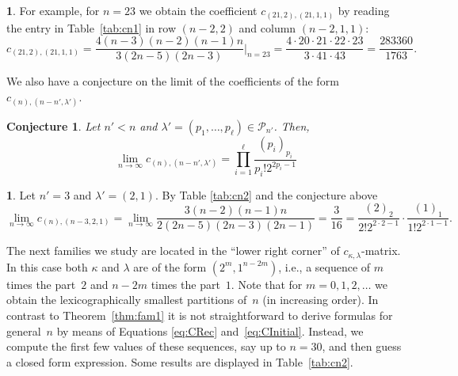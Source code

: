 \documentclass{mathincs}
\numberwithin{equation}{section}
\numberwithin{figure}{section}
\theoremstyle{plain}
\theoremstyle{definition}
\theoremstyle{remark}
\theoremstyle{plain}
\theoremstyle{definition}
\newtheorem{example}[thm]{\protect\examplename}
\theoremstyle{plain}
\theoremstyle{plain}
\newtheorem{conj}[thm]{Conjecture}
\providecommand{\examplename}{Example}
\begin{document}
\begin{example}
For example, for $n=23$ we obtain the coefficient $c_{(21,2),(21,1,1)}$ by
reading the entry in Table~\ref{tab:cn1} in row $(n-2,2)$ and column
$(n-2,1,1)$:
\[
  c_{(21,2),(21,1,1)} = \frac{4 (n-3) (n-2) (n-1) n}{3 (2 n-5) (2 n-3)} \Bigg|_{n=23}
  = \frac{4 \cdot 20 \cdot 21 \cdot 22 \cdot 23}{3 \cdot 41 \cdot 43}
  = \frac{283360}{1763}.
\]
\end{example}

We also have a conjecture on  the limit of the coefficients of the form $c_{(n),(n-n',\lambda')}$.

\begin{conj}
Let $n'<n$ and $\lambda'=(p_1,\ldots,p_\ell)\in\mathcal{P}_{n'}$. Then, 
\[
\lim_{n\to\infty} c_{(n),(n-n',\lambda') }=\prod_{i=1}^{\ell} \frac{(p_i)_{p_i}}{p_i! 2^{2p_i-1}}
\]
\end{conj}

\begin{example}
Let $n'=3$ and $\lambda'=(2,1)$. By Table \ref{tab:cn2} and the conjecture above
\[
\lim_{n\rightarrow\infty}c_{(n),(n-3,2,1)}=\lim_{n\rightarrow\infty}\frac{3(n-2)(n-1)n}{2(2n-5)(2n-3)(2n-1)}=\frac{3}{16}=\frac{(2)_2}{2!2^{2\cdot 2-1}}\cdot\frac{(1)_1}{1!2^{2\cdot 1-1}}.
\]
\end{example}

The next families we study are located in the ``lower right corner'' of
$c_{\kappa,\lambda}$-matrix. In this case both $\kappa$ and $\lambda$ are of
the form $(2^m,1^{n-2m})$, i.e., a sequence of $m$ times the part~$2$ and
$n-2m$ times the part~$1$. Note that for $m=0,1,2,\dots$ we obtain the
lexicographically smallest partitions of~$n$ (in increasing order).  In
contrast to Theorem~\ref{thm:fam1} it is not straightforward to derive
formulas for general~$n$ by means of Equations \eqref{eq:CRec}
and~\eqref{eq:CInitial}. Instead, we compute the first few values of these
sequences, say up to $n=30$, and then guess a closed form expression.
Some results are displayed in Table~\ref{tab:cn2}.
\end{document}
